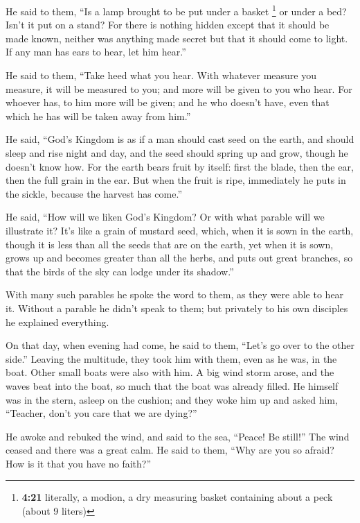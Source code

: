  He said to them, ``Is a lamp brought to be put under a
basket \footnote{\textbf{4:21} literally, a modion, a dry measuring
  basket containing about a peck (about 9 liters)} or under a bed? Isn't
it put on a stand?  For there is nothing hidden except
that it should be made known, neither was anything made secret but that
it should come to light.  If any man has ears to hear,
let him hear.''

 He said to them, ``Take heed what you hear. With
whatever measure you measure, it will be measured to you; and more will
be given to you who hear.  For whoever has, to him more
will be given; and he who doesn't have, even that which he has will be
taken away from him.''

 He said, ``God's Kingdom is as if a man should cast seed
on the earth,  and should sleep and rise night and day,
and the seed should spring up and grow, though he doesn't know how.
 For the earth bears fruit by itself: first the blade,
then the ear, then the full grain in the ear.  But when
the fruit is ripe, immediately he puts in the sickle, because the
harvest has come.''

 He said, ``How will we liken God's Kingdom? Or with what
parable will we illustrate it?  It's like a grain of
mustard seed, which, when it is sown in the earth, though it is less
than all the seeds that are on the earth,  yet when it is
sown, grows up and becomes greater than all the herbs, and puts out
great branches, so that the birds of the sky can lodge under its
shadow.''

 With many such parables he spoke the word to them, as
they were able to hear it.  Without a parable he didn't
speak to them; but privately to his own disciples he explained
everything.

 On that day, when evening had come, he said to them,
``Let's go over to the other side.''  Leaving the
multitude, they took him with them, even as he was, in the boat. Other
small boats were also with him.  A big wind storm arose,
and the waves beat into the boat, so much that the boat was already
filled.  He himself was in the stern, asleep on the
cushion; and they woke him up and asked him, ``Teacher, don't you care
that we are dying?''

 He awoke and rebuked the wind, and said to the sea,
``Peace! Be still!'' The wind ceased and there was a great calm.
 He said to them, ``Why are you so afraid? How is it that
you have no faith?''

